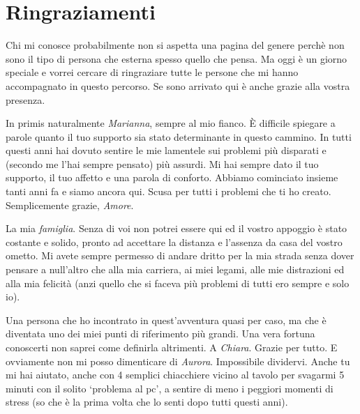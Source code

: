 %
%
\cleardoublepage
%
%
%
\chapter*{Ringraziamenti}
%
Chi mi conosce probabilmente non si aspetta una pagina del genere perchè non sono il tipo di persona che esterna spesso quello che pensa. Ma oggi è un giorno speciale e vorrei cercare di ringraziare tutte le persone che mi hanno accompagnato in questo percorso. Se sono arrivato qui è anche grazie alla vostra presenza.  

In primis naturalmente \emph{Marianna}, sempre al mio fianco. È difficile spiegare a parole quanto il tuo supporto sia stato determinante in questo cammino. In tutti questi anni hai dovuto sentire le mie lamentele sui problemi più disparati e (secondo me l'hai sempre pensato) più assurdi. Mi hai sempre dato il tuo supporto, il tuo affetto e una parola di conforto. Abbiamo cominciato insieme tanti anni fa e siamo ancora qui. Scusa per tutti i problemi che ti ho creato. Semplicemente grazie, \emph{Amore}.

La mia \emph{famiglia}. Senza di voi non potrei essere qui ed il vostro appoggio è stato costante e solido, pronto ad accettare la distanza e l’assenza da casa del vostro ometto. Mi avete sempre permesso di andare dritto per la mia strada senza dover pensare a null’altro che alla mia carriera, ai miei legami, alle mie distrazioni
ed alla mia felicità (anzi quello che si faceva più problemi di tutti ero sempre e solo io).

Una persona che ho incontrato in quest'avventura quasi per caso, ma che è diventata uno dei miei punti di riferimento più grandi. Una vera fortuna conoscerti non saprei come definirla altrimenti. A \emph{Chiara}. Grazie per tutto. E ovviamente non mi posso dimenticare di \emph{Aurora}. Impossibile dividervi. Anche tu mi hai aiutato, anche con 4 semplici chiacchiere vicino al tavolo per svagarmi 5 minuti con il solito \enquote*{problema al pc}, a sentire di meno i peggiori momenti di stress (so che è la prima volta che lo senti dopo tutti questi anni).

